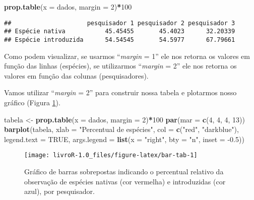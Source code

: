 \documentclass[14pt,titlepage, oneside, openany, a4paper]{book}
\newenvironment{Shaded}{\begin{snugshade}}{\end{snugshade}}
\newcommand{\DataTypeTok}[1]{\textcolor[rgb]{0.13,0.29,0.53}{#1}}
\newcommand{\DecValTok}[1]{\textcolor[rgb]{0.00,0.00,0.81}{#1}}
\newcommand{\FloatTok}[1]{\textcolor[rgb]{0.00,0.00,0.81}{#1}}
\newcommand{\KeywordTok}[1]{\textcolor[rgb]{0.13,0.29,0.53}{\textbf{#1}}}
\newcommand{\NormalTok}[1]{#1}
\newcommand{\OperatorTok}[1]{\textcolor[rgb]{0.81,0.36,0.00}{\textbf{#1}}}
\newcommand{\OtherTok}[1]{\textcolor[rgb]{0.56,0.35,0.01}{#1}}
\newcommand{\StringTok}[1]{\textcolor[rgb]{0.31,0.60,0.02}{#1}}
\begin{document}
\begin{Shaded}
\begin{Highlighting}[]
\KeywordTok{prop.table}\NormalTok{(}\DataTypeTok{x =}\NormalTok{ dados, }\DataTypeTok{margin =} \DecValTok{2}\NormalTok{)}\OperatorTok{*}\DecValTok{100}
\end{Highlighting}
\end{Shaded}

\begin{verbatim}
##                     pesquisador 1 pesquisador 2 pesquisador 3
## Espécie nativa           45.45455       45.4023      32.20339
## Espécie introduzida      54.54545       54.5977      67.79661
\end{verbatim}

Como podem visualizar, se usarmos ``\emph{margin} = 1'' ele nos retorna os valores em função das linhas (espécies), se utilizarmos ``\emph{margin} = 2'' ele nos retorna os valores em função das colunas (pesquisadores).

Vamos utilizar ``\emph{margin} = 2'' para construir nossa tabela e plotarmos nosso gráfico (Figura \ref{fig:bar-tab}).

\begin{Shaded}
\begin{Highlighting}[]
\NormalTok{tabela <-}\StringTok{ }\KeywordTok{prop.table}\NormalTok{(}\DataTypeTok{x =}\NormalTok{ dados, }\DataTypeTok{margin =} \DecValTok{2}\NormalTok{)}\OperatorTok{*}\DecValTok{100}
\KeywordTok{par}\NormalTok{(}\DataTypeTok{mar =} \KeywordTok{c}\NormalTok{(}\DecValTok{4}\NormalTok{, }\DecValTok{4}\NormalTok{, }\DecValTok{4}\NormalTok{, }\DecValTok{13}\NormalTok{))}
\KeywordTok{barplot}\NormalTok{(tabela, }
        \DataTypeTok{xlab =} \StringTok{"Percentual de espécies"}\NormalTok{,}
        \DataTypeTok{col =} \KeywordTok{c}\NormalTok{(}\StringTok{"red"}\NormalTok{, }\StringTok{"darkblue"}\NormalTok{), }
        \DataTypeTok{legend.text =} \OtherTok{TRUE}\NormalTok{, }
        \DataTypeTok{args.legend =} \KeywordTok{list}\NormalTok{(}\DataTypeTok{x =} \StringTok{"right"}\NormalTok{, }\DataTypeTok{bty =} \StringTok{"n"}\NormalTok{, }\DataTypeTok{inset =} \FloatTok{-0.5}\NormalTok{))}
\end{Highlighting}
\end{Shaded}

\begin{figure}[H]

{\centering \texttt{[image: livroR-1.0\_files/figure-latex/bar-tab-1]} 

}

\caption{Gráfico de barras sobrepostas indicando o percentual relativo da observação de espécies nativas (cor vermelha) e introduzidas (cor azul), por pesquisador.}\label{fig:bar-tab}
\end{figure}
\end{document}
